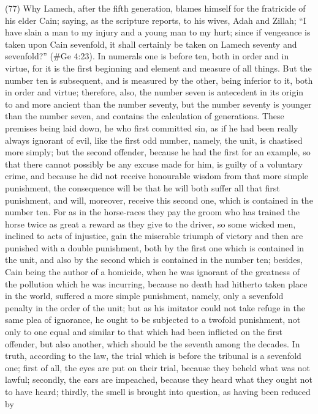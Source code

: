 (77) Why Lamech, after the fifth generation, blames himself for the fratricide of his elder Cain;
saying, as the scripture reports, to his wives, Adah and Zillah; ``I have slain a man to my injury and
a young man to my hurt; since if vengeance is taken upon Cain sevenfold, it shall certainly be taken
on Lamech seventy and sevenfold?'' (\#Ge 4:23). In numerals one is before ten, both in order
and in virtue, for it is the first beginning and element and measure of all things. But the number ten
is subsequent, and is measured by the other, being inferior to it, both in order and virtue; therefore,
also, the number seven is antecedent in its origin to and more ancient than the number seventy,
but the number seventy is younger than the number seven, and contains the calculation of
generations. These premises being laid down, he who first committed sin, as if he had been really
always ignorant of evil, like the first odd number, namely, the unit, is chastised more simply; but the
second offender, because he had the first for an example, so that there cannot possibly be any
excuse made for him, is guilty of a voluntary crime, and because he did not receive honourable
wisdom from that more simple punishment, the consequence will be that he will both suffer all that
first punishment, and will, moreover, receive this second one, which is contained in the number ten.
For as in the horse-races they pay the groom who has trained the horse twice as great a reward
as they give to the driver, so some wicked men, inclined to acts of injustice, gain the miserable
triumph of victory and then are punished with a double punishment, both by the first one which is
contained in the unit, and also by the second which is contained in the number ten; besides, Cain
being the author of a homicide, when he was ignorant of the greatness of the pollution which he
was incurring, because no death had hitherto taken place in the world, suffered a more simple
punishment, namely, only a sevenfold penalty in the order of the unit; but as his imitator could not
take refuge in the same plea of ignorance, he ought to be subjected to a twofold punishment, not
only to one equal and similar to that which had been inflicted on the first offender, but also another,
which should be the seventh among the decades. In truth, according to the law, the trial which is
before the tribunal is a sevenfold one; first of all, the eyes are put on their trial, because they
beheld what was not lawful; secondly, the ears are impeached, because they heard what they
ought not to have heard; thirdly, the smell is brought into question, as having been reduced by
